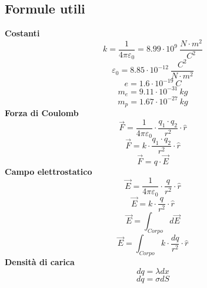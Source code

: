 \documentclass[twoside]{article}
\begin{document}
\subsection{Formule utili}
\textbf{Costanti}
\begin{equation}
    k = \displaystyle \frac{1}{4\pi\varepsilon_0} = 8.99 \cdot 10^9 \ \frac{N \cdot m^2}{C^2}
\end{equation}
\begin{equation}
    \varepsilon_0 = 8.85 \cdot 10^{-12} \ \frac{C^2}{N \cdot m^2}
\end{equation}
\begin{equation}
    e = 1.6 \cdot 10^{-19} \ C
\end{equation}
\begin{equation}
    m_e = 9.11 \cdot 10^{-31} \ kg
\end{equation}
\begin{equation}
    m_p = 1.67 \cdot 10^{-27} \ kg
\end{equation}
\textbf{Forza di Coulomb}
\begin{equation}
    \boxed{\vec{F} = \displaystyle \frac{1}{4\pi\varepsilon_0} \cdot \frac{q_1 \cdot q_2}{r^2} \cdot \hat{r}}
\end{equation}
\begin{equation}
    \boxed{\vec{F} = \displaystyle k \cdot \frac{q_1 \cdot q_2}{r^2} \cdot \hat{r}}
\end{equation}
\begin{equation}
    \boxed{\vec{F} = q \cdot \vec{E}}
\end{equation}
\textbf{Campo elettrostatico}
\begin{equation}
    \boxed{\vec{E} = \displaystyle \frac{1}{4\pi\varepsilon_0} \cdot \frac{q}{r^2} \cdot \hat{r}}
\end{equation}
\begin{equation}
    \boxed{\vec{E} = \displaystyle k \cdot \frac{q}{r^2} \cdot \hat{r}}
\end{equation}
\begin{equation}
    \boxed{\vec{E} = \int_{Corpo} d \vec{E}}
\end{equation}
\begin{equation}
    \boxed{\vec{E} = \int_{Corpo} \displaystyle k \cdot \frac{dq}{r^2} \cdot \hat{r}}
\end{equation}
\textbf{Densità di carica}
\begin{equation}
    \boxed{dq = \lambda dx}
\end{equation}
\begin{equation}
    \boxed{dq = \sigma dS}
\end{equation}
\end{document}

